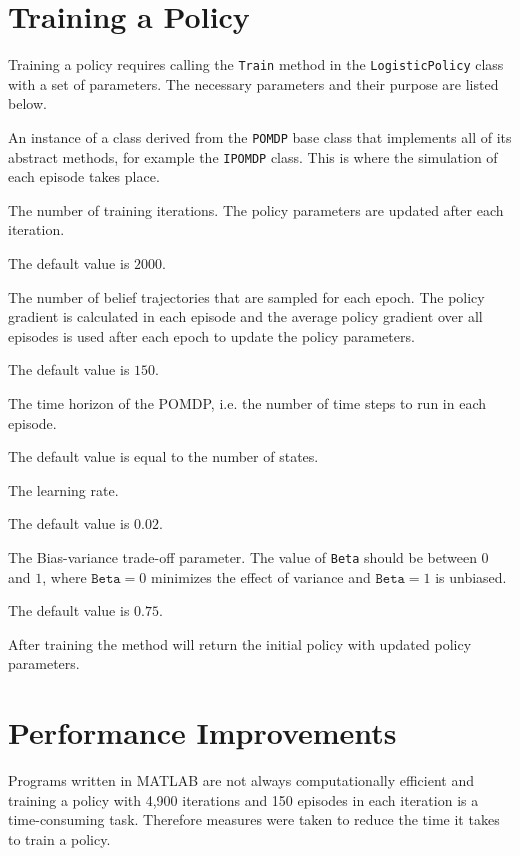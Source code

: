 \section{Training a Policy}
\label{sec:PolicyTraining}
Training a policy requires calling the \texttt{Train} method in the \texttt{LogisticPolicy} class with a set of parameters. The necessary parameters and their purpose are listed below.
\begin{description} [style=nextline]
  \item[\texttt{POMDP}]
  An instance of a class derived from the \texttt{POMDP} base class that implements all of its abstract methods, for example the \texttt{IPOMDP} class. This is where the simulation of each episode takes place.

  \item[\texttt{Epochs}]
  The number of training iterations. The policy parameters are updated after each iteration.

  The default value is $2000$.

  \item[\texttt{Episodes}]
  The number of belief trajectories that are sampled for each epoch. The policy gradient is calculated in each episode and the average policy gradient over all episodes is used after each epoch to update the policy parameters.

  The default value is $150$.

  \item[\texttt{T}]
  The time horizon of the POMDP, i.e. the number of time steps to run in each episode.

  The default value is equal to the number of states.

  \item[\texttt{Eta}]
  The learning rate.

  The default value is $0.02$.

  \item[\texttt{Beta}]
  The Bias-variance trade-off parameter. The value of \texttt{Beta} should be between $0$ and $1$, where $\texttt{Beta} = 0$ minimizes the effect of variance and $\texttt{Beta} = 1$ is unbiased.

  The default value is $0.75$.
\end{description}
After training the method will return the initial policy with updated policy parameters.

\section{Performance Improvements}
Programs written in MATLAB are not always computationally efficient and training a policy with 4,900 iterations and 150 episodes in each iteration is a time-consuming task. Therefore measures were taken to reduce the time it takes to train a policy.

